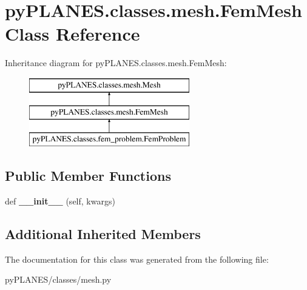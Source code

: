 \hypertarget{classpy_p_l_a_n_e_s_1_1classes_1_1mesh_1_1_fem_mesh}{}\section{py\+P\+L\+A\+N\+E\+S.\+classes.\+mesh.\+Fem\+Mesh Class Reference}
\label{classpy_p_l_a_n_e_s_1_1classes_1_1mesh_1_1_fem_mesh}
Inheritance diagram for py\+P\+L\+A\+N\+E\+S.\+classes.\+mesh.\+Fem\+Mesh\+:\begin{figure}[H]
\begin{center}
\leavevmode
\includegraphics[height=3.000000cm]{classpy_p_l_a_n_e_s_1_1classes_1_1mesh_1_1_fem_mesh}
\end{center}
\end{figure}
\subsection*{Public Member Functions}
\begin{DoxyCompactItemize}
\item 
\mbox{\label{classpy_p_l_a_n_e_s_1_1classes_1_1mesh_1_1_fem_mesh_a8407a55e891bad2d7cd06ddefe2c8963}} 
def {\bfseries \+\_\+\+\_\+init\+\_\+\+\_\+} (self, kwargs)
\end{DoxyCompactItemize}
\subsection*{Additional Inherited Members}


The documentation for this class was generated from the following file\+:\begin{DoxyCompactItemize}
\item 
py\+P\+L\+A\+N\+E\+S/classes/mesh.\+py\end{DoxyCompactItemize}

